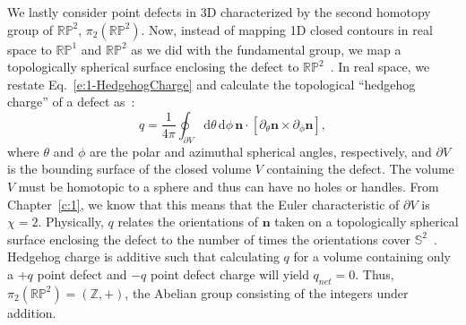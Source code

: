 We lastly consider point defects in 3D characterized by the second homotopy group of $\mathbb{R}\mathbb{P}^2$, $\pi_{2}(\mathbb{R}\mathbb{P}^2)$.
Now, instead of mapping 1D closed contours in real space to $\mathbb{R}\mathbb{P}^1$ and $\mathbb{R}\mathbb{P}^2$ as we did with the fundamental group, we map a topologically spherical surface enclosing the defect to $\mathbb{R}\mathbb{P}^2$~\cite{RN196,RN153,RN236}.
In real space, we restate Eq.~\ref{e:1-HedgehogCharge} and calculate the topological ``hedgehog charge'' of a defect as~\cite{RN153}:
\begin{equation}
  q = \frac{1}{4 \pi} \oint_{\partial V} \textrm{d} \theta \, \textrm{d} \phi \, \mathbf{n} \cdot \left [ \partial_{\theta} \mathbf{n} \times \partial_{\phi} \mathbf{n} \right ],\label{e:2-hedCharge}
\end{equation}
 where $\theta$ and $\phi$ are the polar and azimuthal spherical angles, respectively, and $\partial V$ is the bounding surface of the closed volume $V$ containing the defect.
The volume $V$ must be homotopic to a sphere and thus can have no holes or handles.
From Chapter~\ref{c:1}, we know that this means that the Euler characteristic of $\partial V$ is $\chi = 2$.
Physically, $q$ relates the orientations of $\mathbf{n}$ taken on a topologically spherical surface enclosing the defect to the number of times the orientations cover $\mathbb{S}^2$~\cite{RN153}.
Hedgehog charge is additive such that calculating $q$ for a volume containing only a $+q$ point defect and $-q$ point defect charge will yield $q_{net} = 0$.
Thus, $\pi_{2}(\mathbb{R}\mathbb{P}^2) = (\mathbb{Z}, +)$, the Abelian group consisting of the integers under addition.

